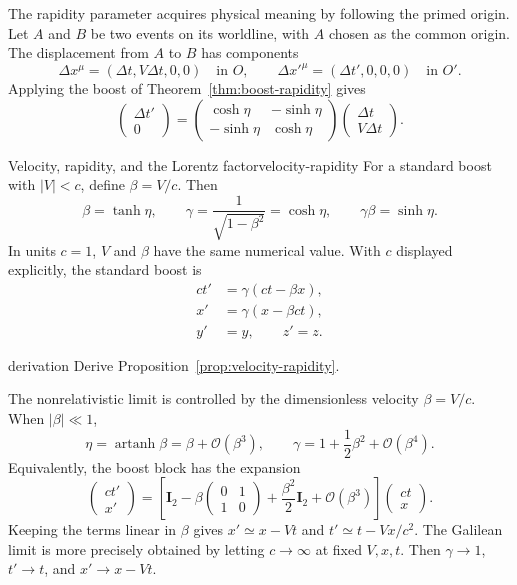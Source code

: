 \documentclass[11pt,a4paper]{article}
\newcommand{\id}{\mathbf{I}}
\newcommand{\order}[1]{\mathcal{O}\!\left(#1\right)}
\begin{document}
The rapidity parameter acquires physical meaning by following the primed
origin. Let \(A\) and \(B\) be two events on its worldline, with \(A\) chosen
as the common origin. The displacement from \(A\) to \(B\) has components
\[
  \Delta x^\mu=(\Delta t,V\Delta t,0,0)
  \quad\text{in }O,
  \qquad
  \Delta x'^\mu=(\Delta t',0,0,0)
  \quad\text{in }O'.
\]
Applying the boost of Theorem~\ref{thm:boost-rapidity} gives
\[
\begin{pmatrix}\Delta t'\\0\end{pmatrix}
=
\begin{pmatrix}
  \cosh\eta&-\sinh\eta\\
  -\sinh\eta&\cosh\eta
\end{pmatrix}
\begin{pmatrix}\Delta t\\V\Delta t\end{pmatrix}.
\]

\begin{proposition}{Velocity, rapidity, and the Lorentz factor}{velocity-rapidity}
For a standard boost with \(|V|<c\), define \(\beta=V/c\). Then
\[
  \beta=\tanh\eta,\qquad
  \gamma=\frac{1}{\sqrt{1-\beta^2}}=\cosh\eta,\qquad
  \gamma\beta=\sinh\eta.
\]
In units \(c=1\), \(V\) and \(\beta\) have the same numerical value.
With \(c\) displayed explicitly, the standard boost is
\[
\boxed{
\begin{aligned}
  ct'&=\gamma(ct-\beta x),\\
  x'&=\gamma(x-\beta ct),\\
  y'&=y,\qquad z'=z.
\end{aligned}}
\]
\end{proposition}

\begin{studentwork}[height=9.5cm]{derivation}
Derive Proposition~\ref{prop:velocity-rapidity}.
\end{studentwork}

The nonrelativistic limit is controlled by the dimensionless velocity
\(\beta=V/c\). When \(|\beta|\ll1\),
\[
  \eta=\operatorname{artanh}\beta=\beta+\order{\beta^3},
  \qquad
  \gamma=1+\frac12\beta^2+\order{\beta^4}.
\]
Equivalently, the boost block has the expansion
\[
  \begin{pmatrix}ct'\\x'\end{pmatrix}
  =\left[
    \id_2-\beta\begin{pmatrix}0&1\\1&0\end{pmatrix}
    +\frac{\beta^2}{2}\id_2+\order{\beta^3}
  \right]
  \begin{pmatrix}ct\\x\end{pmatrix}.
\]
Keeping the terms linear in \(\beta\) gives
\(x'\simeq x-Vt\) and \(t'\simeq t-Vx/c^2\). The Galilean limit is more
precisely obtained by letting \(c\to\infty\) at fixed \(V,x,t\). Then
\(\gamma\to1\), \(t'\to t\), and \(x'\to x-Vt\).
\end{document}
